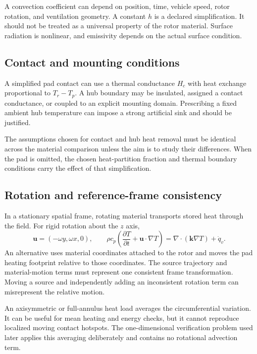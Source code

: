 \documentclass[11pt,a4paper]{article}
\begin{document}
A convection coefficient can depend on position, time, vehicle speed, rotor rotation, and ventilation geometry. A constant $h$ is a declared simplification. It should not be treated as a universal property of the rotor material. Surface radiation is nonlinear, and emissivity depends on the actual surface condition.

\subsection{Contact and mounting conditions}
A simplified pad contact can use a thermal conductance $H_c$ with heat exchange proportional to $T_r-T_p$. A hub boundary may be insulated, assigned a contact conductance, or coupled to an explicit mounting domain. Prescribing a fixed ambient hub temperature can impose a strong artificial sink and should be justified.

The assumptions chosen for contact and hub heat removal must be identical across the material comparison unless the aim is to study their differences. When the pad is omitted, the chosen heat-partition fraction and thermal boundary conditions carry the effect of that simplification.

\clearpage
\subsection{Rotation and reference-frame consistency}
In a stationary spatial frame, rotating material transports stored heat through the field. For rigid rotation about the $z$ axis,
\begin{equation}
\mathbf u=(-\omega y,\omega x,0),\qquad
\rho c_p\left(\frac{\partial T}{\partial t}+\mathbf u\cdot\nabla T\right)
=\nabla\cdot(\mathbf k\nabla T)+\dot q_v.
\end{equation}
An alternative uses material coordinates attached to the rotor and moves the pad heating footprint relative to those coordinates. The source trajectory and material-motion terms must represent one consistent frame transformation. Moving a source and independently adding an inconsistent rotation term can misrepresent the relative motion.

An axisymmetric or full-annulus heat load averages the circumferential variation. It can be useful for mean heating and energy checks, but it cannot reproduce localized moving contact hotspots. The one-dimensional verification problem used later applies this averaging deliberately and contains no rotational advection term.
\end{document}
